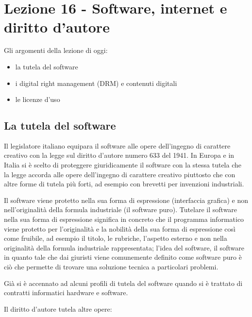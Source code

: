 \chapter{Lezione 16 - Software, internet e diritto d'autore}

Gli argomenti della lezione di oggi:

\begin{itemize}
    \item la tutela del software
    \item i digital right management (DRM) e contenuti digitali
    \item le licenze d'uso
\end{itemize}


\section{La tutela del software}
Il legislatore italiano equipara il software alle opere dell'ingegno di carattere creativo con la legge sul diritto d'autore numero 633 del 1941. In Europa e in Italia si è scelto di proteggere giuridicamente il software con la stessa tutela che la legge accorda alle opere dell'ingegno di carattere creativo piuttosto che con altre forme di tutela più forti, ad esempio con brevetti per invenzioni industriali. 

Il software viene protetto nella sua forma di espressione (interfaccia grafica) e non nell'originalità della formula industriale (il software puro). Tutelare il software nella sua forma di espressione significa in concreto che il programma informatico viene protetto per l'originalità e la nobilità della sua forma di espressione così come fruibile, ad esempio il titolo, le rubriche, l'aspetto esterno e non nella originalità della formula industriale rappresentata;  l'idea del software, il software in quanto tale che dai giuristi viene comunemente definito come software puro è ciò che permette di trovare una soluzione tecnica a particolari problemi. 

Già si è accennato ad alcuni profili di tutela del software quando si è trattato di contratti informatici hardware e software. 

Il diritto d'autore tutela altre opere:

